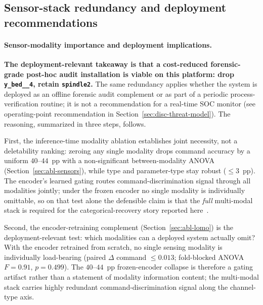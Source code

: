 \documentclass[sensors,article,submit,moreauthors,pdftex]{Definitions/mdpi}
\begin{document}
\subsection{Sensor-stack redundancy and deployment recommendations}
\label{sec:disc-deployment-stack}

\paragraph{Sensor-modality importance and deployment implications.}\label{sec:disc-modality}\hspace*{0pt plus 1fill}

\textbf{The deployment-relevant takeaway is that a cost-reduced forensic-grade post-hoc audit installation is viable on this platform: drop \texttt{y\_bed\_\_4}, retain \texttt{spindle2}.} The same redundancy applies whether the system is deployed as an offline forensic audit complement or as part of a periodic process-verification routine; it is not a recommendation for a real-time SOC monitor (see operating-point recommendation in Section~\ref{sec:disc-threat-model}). The reasoning, summarized in three steps, follows.

First, the inference-time modality ablation establishes joint necessity, not a deletability ranking: zeroing any single modality drops command accuracy by a uniform $40$--$44$~pp with a non-significant between-modality ANOVA (Section~\ref{sec:abl-sensors}), while type and parameter-type stay robust ($\le\!3$~pp). The encoder's learned gating routes command-discrimination signal through all modalities jointly; under the frozen encoder no single modality is individually omittable, so on that test alone the defensible claim is that the \emph{full} multi-modal stack is required for the categorical-recovery story reported here~\cite{kimmell2025cnc,nist2023sp80082,nist2024fmnet}.

Second, the encoder-retraining complement (Section~\ref{sec:abl-lomo}) is the deployment-relevant test: which modalities can a deployed system actually omit? With the encoder retrained from scratch, no single sensing modality is individually load-bearing (paired $\Delta$ command $\le\!0.013$; fold-blocked ANOVA $F\!=\!0.91$, $p\!=\!0.499$). The $40$--$44$~pp frozen-encoder collapse is therefore a gating artifact rather than a statement of modality information content; the multi-modal stack carries highly redundant command-discrimination signal along the channel-type axis.
\end{document}
